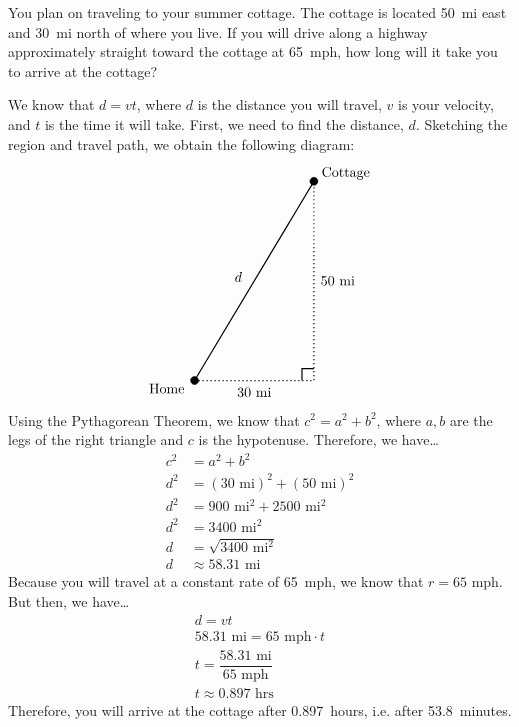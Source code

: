 \documentclass[11pt,letterpaper]{article}
\begin{document}
\newpage



 You plan on traveling to your summer cottage. The cottage is located 50~mi east and 30~mi north of where you live. If you will drive along a highway approximately straight toward the cottage at 65~mph, how long will it take you to arrive at the cottage? \pspace

\sol We know that $d= vt$, where $d$ is the distance you will travel, $v$ is your velocity, and $t$ is the time it will take. First, we need to find the distance, $d$. Sketching the region and travel path, we obtain the following diagram:
	\[
	\begin{tikzpicture}
	\node at (-0.7,-0.2) {Home};
	\node at (3.8,5.2) {Cottage};
	\node at (1.5,-0.3) {30~mi};
	\node at (3.6,2.5) {50~mi};
	\node at (1.1,2.6) {$d$};
	
	\draw[line width=0.03cm,dotted] (0,0) -- (3,0) -- (3,5);
	\draw[line width=0.03cm] (0,0) -- (3,5);
	\draw[line width=0.03cm] (2.7,0) -- (2.7,0.3) -- (3,0.3);
	
	\draw[fill=black] (0,0) circle (0.1);
	\draw[fill=black] (3,5) circle (0.1);
	\end{tikzpicture}
	\]
Using the Pythagorean Theorem, we know that $c^2= a^2 + b^2$, where $a, b$ are the legs of the right triangle and $c$ is the hypotenuse. Therefore, we have\dots
	\[
	\begin{aligned}
	c^2&= a^2 + b^2 \\
	d^2&= (30 \text{ mi})^2 + (50 \text{ mi})^2 \\
	d^2&= 900 \text{ mi}^2 + 2500 \text{ mi}^2 \\
	d^2&= 3400 \text{ mi}^2 \\
	d&= \sqrt{3400 \text{ mi}^2} \\
	d&\approx 58.31 \text{ mi}
	\end{aligned}
	\]
Because you will travel at a constant rate of 65~mph, we know that $r= 65 \text{ mph}$. But then, we have\dots
	\[
	\begin{gathered}
	d= vt \\[0.3cm]
	58.31 \text{ mi}= 65 \text{ mph} \cdot t \\[0.3cm]
	t= \dfrac{58.31 \text{ mi}}{65 \text{ mph}} \\[0.3cm]
	t \approx 0.897 \text{ hrs}
	\end{gathered}
	\]
Therefore, you will arrive at the cottage after 0.897~hours, i.e. after 53.8~minutes. 
\end{document}
